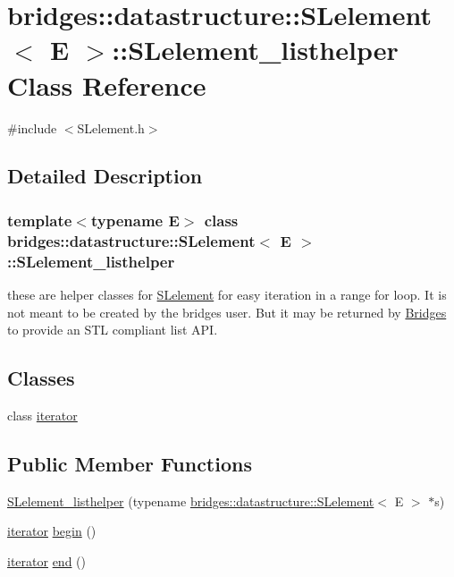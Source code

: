 \hypertarget{classbridges_1_1datastructure_1_1_s_lelement_1_1_s_lelement__listhelper}{}\section{bridges\+:\+:datastructure\+:\+:S\+Lelement$<$ E $>$\+:\+:S\+Lelement\+\_\+listhelper Class Reference}
\label{classbridges_1_1datastructure_1_1_s_lelement_1_1_s_lelement__listhelper}


{\ttfamily \#include $<$S\+Lelement.\+h$>$}



\subsection{Detailed Description}
\subsubsection*{template$<$typename E$>$\newline
class bridges\+::datastructure\+::\+S\+Lelement$<$ E $>$\+::\+S\+Lelement\+\_\+listhelper}

these are helper classes for \hyperlink{classbridges_1_1datastructure_1_1_s_lelement}{S\+Lelement} for easy iteration in a range for loop. It is not meant to be created by the bridges user. But it may be returned by \hyperlink{classbridges_1_1_bridges}{Bridges} to provide an S\+TL compliant list A\+PI. \subsection*{Classes}
\begin{DoxyCompactItemize}
\item 
class \hyperlink{classbridges_1_1datastructure_1_1_s_lelement_1_1_s_lelement__listhelper_1_1iterator}{iterator}
\end{DoxyCompactItemize}
\subsection*{Public Member Functions}
\begin{DoxyCompactItemize}
\item 
\hyperlink{classbridges_1_1datastructure_1_1_s_lelement_1_1_s_lelement__listhelper_af58b3e4590449c12ca505a8f05740046}{S\+Lelement\+\_\+listhelper} (typename \hyperlink{classbridges_1_1datastructure_1_1_s_lelement}{bridges\+::datastructure\+::\+S\+Lelement}$<$ E $>$ $\ast$s)
\item 
\hyperlink{classbridges_1_1datastructure_1_1_s_lelement_1_1_s_lelement__listhelper_1_1iterator}{iterator} \hyperlink{classbridges_1_1datastructure_1_1_s_lelement_1_1_s_lelement__listhelper_a9bc74da8d0ae6cfc9506ea9480c33a15}{begin} ()
\item 
\hyperlink{classbridges_1_1datastructure_1_1_s_lelement_1_1_s_lelement__listhelper_1_1iterator}{iterator} \hyperlink{classbridges_1_1datastructure_1_1_s_lelement_1_1_s_lelement__listhelper_aecbbc35682d82fa86a746b9a588525d0}{end} ()
\end{DoxyCompactItemize}


